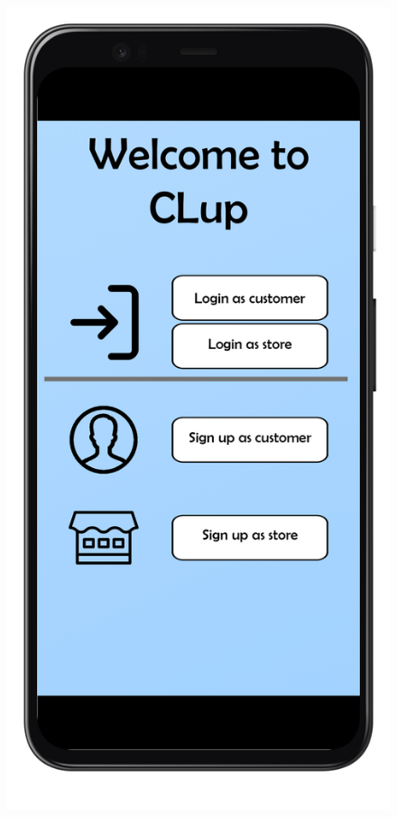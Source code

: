 \documentclass{article}
\begin{document}
			\begin{figure}[!h]
				\centering
				\begin{minipage}[!h]{0.4\textwidth}
					\includegraphics[width=\textwidth]{../Mockups/InitialPage.png}

\end{minipage}
\end{figure}
\end{document}
